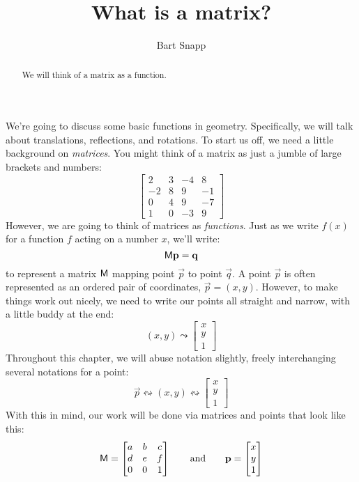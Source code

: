 \documentclass{ximera}
\title{What is a matrix?}
\author{Bart Snapp}
\begin{document}
\begin{abstract}
  We will think of a matrix as a function.
\end{abstract}
\maketitle

We're going to discuss some basic functions in geometry.
Specifically, we will talk about translations, reflections, and
rotations. To start us off, we need a little background on
\textit{matrices}. You might think of a matrix as just a jumble
of large brackets and numbers:
\[
\begin{bmatrix}
  2 & 3 & -4 & 8 \\
  -2 & 8 & 9 & -1 \\
  0 & 4 & 9 & -7\\
  1 & 0  & -3 & 9
\end{bmatrix}
\]
However, we are going to think of
matrices as \textit{functions}. Just as we write $f(x)$ for a function
$f$ acting on a number $x$, we'll write:
\[
\mathsf{M} \mathbf{p} = \mathbf{q} 
\]
to represent a matrix $\mathsf{M}$ mapping point $\vec{p}$ to point
$\vec{q}$. A point $\vec p$ is often represented as an ordered pair of
coordinates, $\vec{p} = (x,y)$. However, to make things work out
nicely, we need to write our points all straight and narrow, with a
little buddy at the end:
\[
(x,y) \leadsto \begin{bmatrix} 
x \\ 
y \\
1
\end{bmatrix}
\]
Throughout this chapter, we will abuse notation slightly, freely
interchanging several notations for a point:
\[
\vec{p} \leftrightsquigarrow
(x,y) \leftrightsquigarrow
\begin{bmatrix} 
x \\ 
y \\
1
\end{bmatrix}
\]
With this in mind, our work will be done via matrices and
points that look like this:
\[
\mathsf{M} = 
\begin{bmatrix}
a & b & c \\ 
d & e & f \\
0 & 0 & 1
\end{bmatrix}\qquad\text{and}\qquad \mathbf{p} = 
\begin{bmatrix}
x \\
y \\
1
\end{bmatrix}
\]
\end{document}
